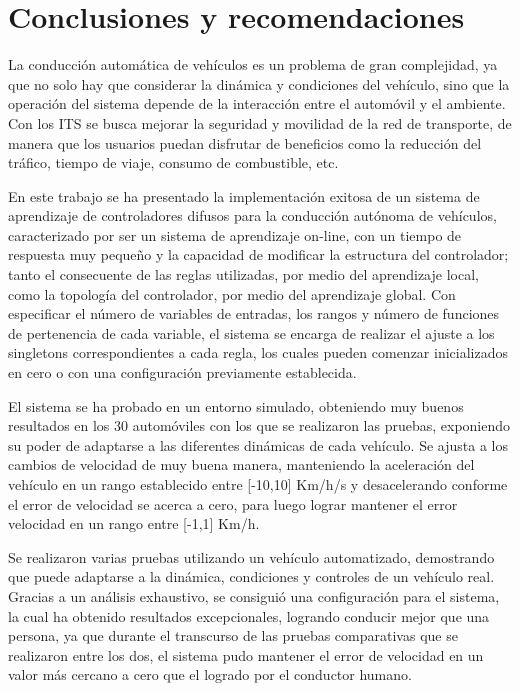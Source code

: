 \chapter{Conclusiones y recomendaciones} 


La conducción automática de vehículos es un problema de gran complejidad, ya que no solo hay que considerar la dinámica y condiciones del vehículo, sino que la operación del sistema depende de la interacción entre el automóvil y el ambiente. Con los \gls{ITS} se busca mejorar la seguridad y movilidad de la red de transporte, de manera que los usuarios puedan disfrutar de beneficios  como la reducción del tráfico, tiempo de viaje, consumo de combustible, etc.

En este trabajo se ha presentado la implementación exitosa de un sistema de aprendizaje de controladores difusos para la conducción autónoma de vehículos, caracterizado por ser un sistema de aprendizaje on-line, con un tiempo de respuesta muy pequeño y la capacidad de modificar la estructura del controlador; tanto el consecuente de las reglas utilizadas, por medio del aprendizaje local, como la topología del controlador, por medio del aprendizaje global. Con especificar el número de variables de entradas, los rangos y número de funciones de pertenencia de cada variable, el sistema se encarga de realizar el ajuste a los singletons correspondientes a cada regla, los cuales pueden comenzar inicializados en cero o con una configuración previamente establecida.

El sistema se ha probado en un entorno simulado, obteniendo muy buenos resultados en los 30 automóviles con los que se realizaron las pruebas, exponiendo su poder de adaptarse a las diferentes dinámicas de cada vehículo. Se ajusta a los cambios de velocidad de muy buena manera, manteniendo la aceleración del vehículo en un rango establecido entre [-10,10] Km/h/s y desacelerando conforme el error de velocidad se acerca a cero, para luego lograr mantener el error velocidad en un rango entre [-1,1] Km/h.

Se realizaron varias pruebas utilizando un vehículo automatizado, demostrando que puede adaptarse a la dinámica, condiciones  y controles de un vehículo real. Gracias a un análisis exhaustivo, se consiguió una configuración para el sistema, la cual ha obtenido resultados excepcionales, logrando conducir mejor que una persona, ya que durante el transcurso de las pruebas comparativas que se realizaron entre los dos, el sistema pudo mantener el error de velocidad en un valor más cercano a cero que el logrado por el conductor humano. 

